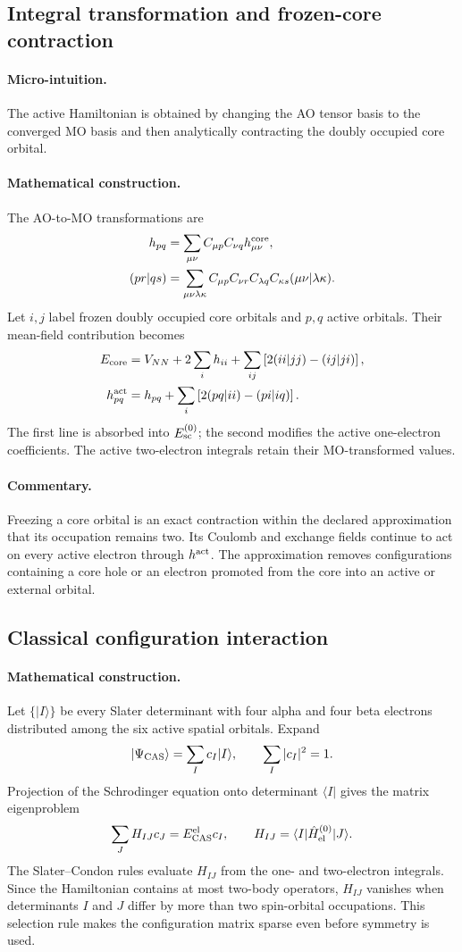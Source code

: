 \documentclass[10pt,twocolumn]{article}
\newcommand{\ket}[1]{\lvert #1\rangle}
\newcommand{\bra}[1]{\langle #1\rvert}
\newcommand{\micro}{\paragraph{Micro-intuition.}}
\newcommand{\mathderiv}{\paragraph{Mathematical construction.}}
\newcommand{\commentaryblock}{\paragraph{Commentary.}}
\begin{document}
\subsection*{Integral transformation and frozen-core contraction}

\micro The active Hamiltonian is obtained by changing the AO tensor basis to
the converged MO basis and then analytically contracting the doubly occupied
core orbital.

\mathderiv The AO-to-MO transformations are
\begin{align}
h_{pq}&=\sum_{\mu\nu}C_{\mu p}C_{\nu q}h^{\rm core}_{\mu\nu},\nonumber\\
(pr|qs)&=\sum_{\mu\nu\lambda\kappa}
C_{\mu p}C_{\nu r}C_{\lambda q}C_{\kappa s}
(\mu\nu|\lambda\kappa).
\label{eq:ao-mo-transform}
\end{align}
Let $i,j$ label frozen doubly occupied core orbitals and $p,q$ active orbitals.
Their mean-field contribution becomes
\begin{align}
E_{\rm core}
={}&V_{NN}+2\sum_i h_{ii}
+\sum_{ij}\left[2(ii|jj)-(ij|ji)\right],\nonumber\\
h^{\rm act}_{pq}
={}&h_{pq}
+\sum_i\left[2(pq|ii)-(pi|iq)\right].
\label{eq:frozen-core}
\end{align}
The first line is absorbed into $E_{\rm sc}^{(0)}$; the second modifies the
active one-electron coefficients.  The active two-electron integrals retain
their MO-transformed values.

\commentaryblock Freezing a core orbital is an exact contraction within the
declared approximation that its occupation remains two.  Its Coulomb and
exchange fields continue to act on every active electron through
$h^{\rm act}$.  The approximation removes configurations containing a core
hole or an electron promoted from the core into an active or external orbital.

\subsection*{Classical configuration interaction}

\mathderiv Let $\{\ket I\}$ be every Slater determinant with four alpha and
four beta electrons distributed among the six active spatial orbitals.  Expand
\begin{equation}
\ket{\Psi_{\rm CAS}}=\sum_I c_I\ket I,\qquad
\sum_I|c_I|^2=1.
\label{eq:ci-expansion}
\end{equation}
Projection of the Schrodinger equation onto determinant $\bra I$ gives the
matrix eigenproblem
\begin{equation}
\sum_J H_{IJ}c_J=E_{\rm CAS}^{\rm el}c_I,\qquad
H_{IJ}=\bra I\hat H_{\rm el}^{(0)}\ket J.
\label{eq:ci-eigenproblem}
\end{equation}
The Slater--Condon rules evaluate $H_{IJ}$ from the one- and two-electron
integrals.  Since the Hamiltonian contains at most two-body operators,
$H_{IJ}$ vanishes when determinants $I$ and $J$ differ by more than two
spin-orbital occupations.  This selection rule makes the configuration matrix
sparse even before symmetry is used.
\end{document}
